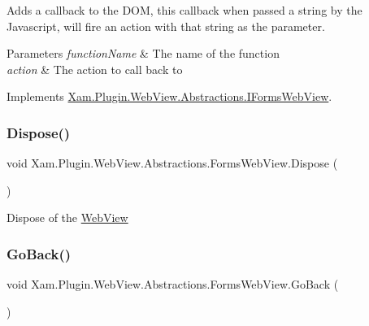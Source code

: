Adds a callback to the D\+OM, this callback when passed a string by the Javascript, will fire an action with that string as the parameter. 


\begin{DoxyParams}{Parameters}
{\em function\+Name} & The name of the function\\
\hline
{\em action} & The action to call back to\\
\hline
\end{DoxyParams}


Implements \hyperlink{interface_xam_1_1_plugin_1_1_web_view_1_1_abstractions_1_1_i_forms_web_view}{Xam.\+Plugin.\+Web\+View.\+Abstractions.\+I\+Forms\+Web\+View}.

\mbox{\label{class_xam_1_1_plugin_1_1_web_view_1_1_abstractions_1_1_forms_web_view_afc44efe2ad01ff5d59d6988a3c4f0099}} 
\subsubsection{\texorpdfstring{Dispose()}{Dispose()}}
{\footnotesize\ttfamily void Xam.\+Plugin.\+Web\+View.\+Abstractions.\+Forms\+Web\+View.\+Dispose (\begin{DoxyParamCaption}{ }\end{DoxyParamCaption})}



Dispose of the \hyperlink{namespace_xam_1_1_plugin_1_1_web_view}{Web\+View} 

\mbox{\label{class_xam_1_1_plugin_1_1_web_view_1_1_abstractions_1_1_forms_web_view_a20b5e4e87cd76967d336cc7d174e156b}} 
\subsubsection{\texorpdfstring{Go\+Back()}{GoBack()}}
{\footnotesize\ttfamily void Xam.\+Plugin.\+Web\+View.\+Abstractions.\+Forms\+Web\+View.\+Go\+Back (\begin{DoxyParamCaption}{ }\end{DoxyParamCaption})}



